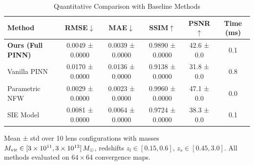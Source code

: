 \begin{table}[t]
\centering
\caption{Quantitative Comparison with Baseline Methods}
\label{tab:sota}
\small
\begin{tabular}{l|cccc|c}
\toprule
\textbf{Method} & \textbf{RMSE}$\downarrow$ & \textbf{MAE}$\downarrow$ & \textbf{SSIM}$\uparrow$ & \textbf{PSNR}$\uparrow$ & \textbf{Time (ms)} \\
\midrule
  \textbf{Ours (Full PINN)} & 0.0049 ± 0.0000 & 0.0039 ± 0.0000 & 0.9890 ± 0.0000 & 42.6 ± 0.0 & 0.1 \\
  Vanilla PINN & 0.0170 ± 0.0000 & 0.0136 ± 0.0000 & 0.9138 ± 0.0000 & 31.8 ± 0.0 & 0.8 \\
  Parametric NFW & 0.0029 ± 0.0000 & 0.0023 ± 0.0000 & 0.9960 ± 0.0000 & 47.1 ± 0.0 & 0.0 \\
  SIE Model & 0.0081 ± 0.0000 & 0.0064 ± 0.0000 & 0.9724 ± 0.0000 & 38.3 ± 0.0 & 0.1 \\
\bottomrule
\end{tabular}
\vspace{1mm}
\parbox{\columnwidth}{\footnotesize Mean ± std over 10 lens configurations with masses $M_{\rm vir} \in [3 \times 10^{11}, 3 \times 10^{13}]\,M_\odot$, redshifts $z_l \in [0.15, 0.6]$, $z_s \in [0.45, 3.0]$. All methods evaluated on $64 \times 64$ convergence maps.}
\end{table}
